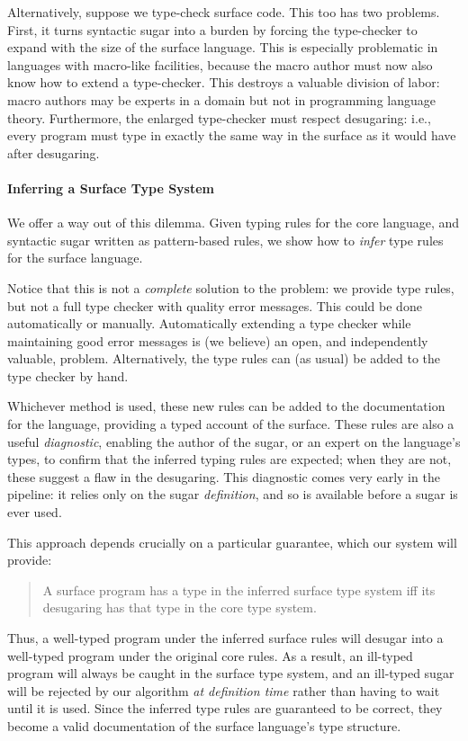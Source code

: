 Alternatively, suppose we type-check surface code. This too has two
problems. First, it turns syntactic sugar into a burden by
forcing the type-checker to expand with the size of the surface
language. This is especially problematic in languages with macro-like
facilities, because the macro author must now also know how to extend
a type-checker. This destroys a valuable division of labor: macro
authors may be experts in a domain but not in programming language
theory.  Furthermore, the enlarged type-checker must respect
desugaring: i.e., every program must type in exactly the same way in
the surface as it would have after desugaring.

\paragraph{Inferring a Surface Type System}

We offer a way out of this dilemma. Given typing rules for the core
language, and syntactic sugar written as pattern-based rules, we show
how to \emph{infer} type rules for the surface language.

Notice that this is not a \emph{complete} solution to the problem: we
provide type rules, but not a full type checker with quality error
messages. This could be done automatically or manually.
Automatically extending a type checker while maintaining good error
messages is (we believe) an open, and independently valuable, problem.
Alternatively, the type rules can (as usual) be added to the type
checker by hand.

Whichever method is used, these new rules can be
added to the documentation for the language, providing a typed account
of the surface. These rules are also a useful \emph{diagnostic},
enabling the author of the sugar, or an expert on the language's
types, to confirm that the inferred typing rules are expected; when
they are not, these suggest a flaw in the desugaring. This diagnostic
comes very early in the pipeline: it relies only on the sugar
\emph{definition}, and so is available before a sugar is ever used.

This approach depends crucially on a particular guarantee, which our
system will provide:
\begin{quotation}
  A surface program has a type in the inferred surface type
  system iff its desugaring has that type in the core type system.
\end{quotation}
Thus, a well-typed program under the inferred surface rules
will desugar into a well-typed program under the original core rules.
As a result, an ill-typed program will always be caught in the surface
type system, and an ill-typed sugar will be rejected by our
algorithm \emph{at definition time} rather than having to wait until
it is used. Since the inferred type rules are guaranteed to be correct,
they become a valid documentation of the
surface language's type structure.

